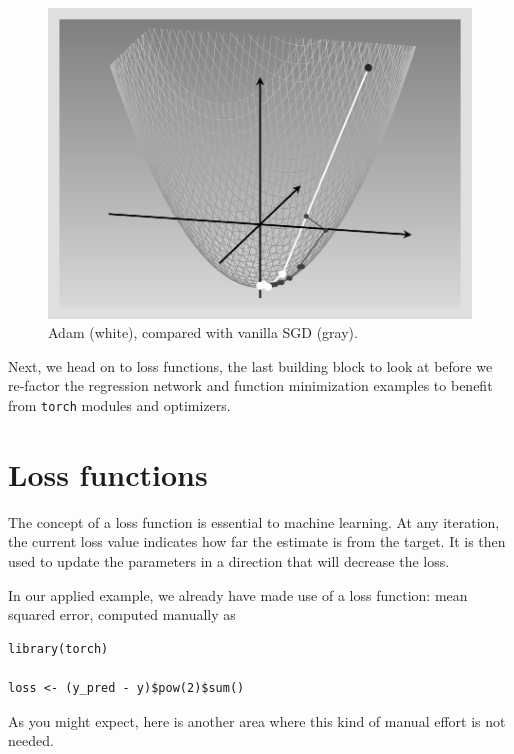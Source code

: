 \documentclass[
  letterpaper,
]{krantz}
\begin{document}
\begin{figure}[H]

{\centering \includegraphics{images/optimizers-adam.png}

}

\caption{\label{fig-optimizers-adam}Adam (white), compared with vanilla
SGD (gray).}

\end{figure}

Next, we head on to loss functions, the last building block to look at
before we re-factor the regression network and function minimization
examples to benefit from \texttt{torch} modules and optimizers.

\hypertarget{sec:loss-functions}{%
\chapter{Loss functions}\label{sec:loss-functions}}

The concept of a loss function is essential to machine learning. At any
iteration, the current loss value indicates how far the estimate is from
the target. It is then used to update the parameters in a direction that
will decrease the loss.

In our applied example, we already have made use of a loss function:
mean squared error, computed manually as

\begin{verbatim}
library(torch)

loss <- (y_pred - y)$pow(2)$sum()
\end{verbatim}

As you might expect, here is another area where this kind of manual
effort is not needed.
\end{document}
